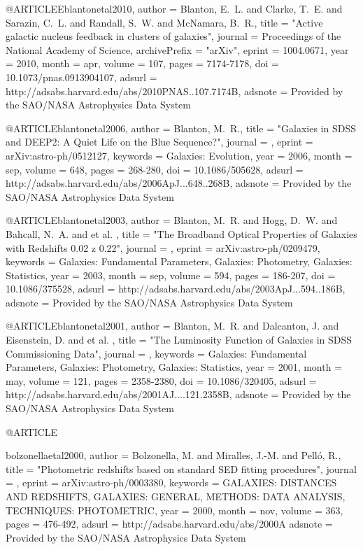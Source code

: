 {{{{{{@ARTICLE{Eblantonetal2010,
   author = {{Blanton}, E.~L. and {Clarke}, T.~E. and {Sarazin}, C.~L. and 
	{Randall}, S.~W. and {McNamara}, B.~R.},
    title = "{Active galactic nucleus feedback in clusters of galaxies}",
  journal = {Proceedings of the National Academy of Science},
archivePrefix = "arXiv",
   eprint = {1004.0671},
     year = 2010,
    month = apr,
   volume = 107,
    pages = {7174-7178},
      doi = {10.1073/pnas.0913904107},
   adsurl = {http://adsabs.harvard.edu/abs/2010PNAS..107.7174B},
  adsnote = {Provided by the SAO/NASA Astrophysics Data System}
}


@ARTICLE{blantonetal2006,
   author = {{Blanton}, M.~R.},
    title = "{Galaxies in SDSS and DEEP2: A Quiet Life on the Blue Sequence?}",
  journal = {\apj},
   eprint = {arXiv:astro-ph/0512127},
 keywords = {Galaxies: Evolution},
     year = 2006,
    month = sep,
   volume = 648,
    pages = {268-280},
      doi = {10.1086/505628},
   adsurl = {http://adsabs.harvard.edu/abs/2006ApJ...648..268B},
  adsnote = {Provided by the SAO/NASA Astrophysics Data System}
}

@ARTICLE{blantonetal2003,
   author = {{Blanton}, M.~R. and {Hogg}, D.~W. and {Bahcall}, N.~A. and 
	et al. },
    title = "{The Broadband Optical Properties of Galaxies with Redshifts 0.02 z 0.22}",
  journal = {\apj},
   eprint = {arXiv:astro-ph/0209479},
 keywords = {Galaxies: Fundamental Parameters, Galaxies: Photometry, Galaxies: Statistics},
     year = 2003,
    month = sep,
   volume = 594,
    pages = {186-207},
      doi = {10.1086/375528},
   adsurl = {http://adsabs.harvard.edu/abs/2003ApJ...594..186B},
  adsnote = {Provided by the SAO/NASA Astrophysics Data System}
}

@ARTICLE{blantonetal2001,
   author = {{Blanton}, M.~R. and {Dalcanton}, J. and {Eisenstein}, D. and  
	et al. },
    title = "{The Luminosity Function of Galaxies in SDSS Commissioning Data}",
  journal = {\aj},
 keywords = {Galaxies: Fundamental Parameters, Galaxies: Photometry, Galaxies: Statistics},
     year = 2001,
    month = may,
   volume = 121,
    pages = {2358-2380},
      doi = {10.1086/320405},
   adsurl = {http://adsabs.harvard.edu/abs/2001AJ....121.2358B},
  adsnote = {Provided by the SAO/NASA Astrophysics Data System}
}



@ARTICLE{bolzonellaetal2000,
   author = {{Bolzonella}, M. and {Miralles}, J.-M. and {Pell{\'o}}, R.},
    title = "{Photometric redshifts based on standard SED fitting procedures}",
  journal = {\aap},
   eprint = {arXiv:astro-ph/0003380},
 keywords = {GALAXIES: DISTANCES AND REDSHIFTS, GALAXIES: GENERAL, METHODS: DATA ANALYSIS, TECHNIQUES: PHOTOMETRIC},
     year = 2000,
    month = nov,
   volume = 363,
    pages = {476-492},
   adsurl = {http://adsabs.harvard.edu/abs/2000A%
  adsnote = {Provided by the SAO/NASA Astrophysics Data System}
}


}}}}}}}
